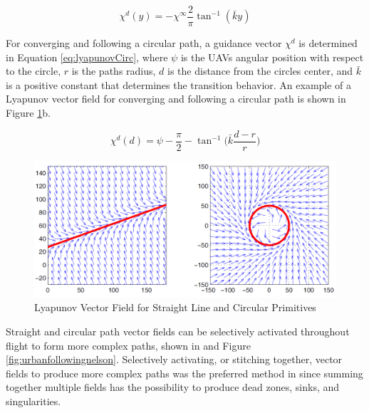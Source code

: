 \documentclass[numbered,pdftex]{ohio-etd}
\begin{document}
\begin{equation}\label{eq:lyapunovStraight}
\chi^d(y) = -\chi^{\infty}\frac{2}{\pi}\tan^{-1}(\bar{k}y)
\end{equation}



For converging and following a circular path, a guidance vector $\chi^{d}$ is determined in Equation \ref{eq:lyapunovCirc}, where $\psi$ is the UAVs angular position with respect to the circle, $r$ is the paths radius, $d$ is the distance from the circles center, and $\bar{k}$ is a positive constant that determines the transition behavior. An example of a Lyapunov vector field for converging and following a circular path is shown in Figure \ref{fig:vfPathPrimitives}b.

\begin{equation}\label{eq:lyapunovCirc}
\chi^d(d) = \psi-\frac{\pi}{2}-\tan^{-1} \bigg(\bar{k} \frac{d-r}{r} \bigg)
\end{equation}


\begin{figure}
	\centering
	\includegraphics[width=13cm]{PaperFigures/nelsonLyapunov}
	\caption{Lyapunov Vector Field for Straight Line and Circular Primitives \cite{nelson_cooperative_2005}}
	\label{fig:vfPathPrimitives}
\end{figure}




Straight and circular path vector fields can be selectively activated throughout flight to form more complex paths, shown in \cite{nelson_cooperative_2005,nelson_vector_2006,nelson_vector_2007,jung_unmanned_2016} and Figure \ref{fig:urbanfollowingnelson}. Selectively activating, or stitching together, vector fields to produce more complex paths was the preferred method in \cite{nelson_cooperative_2005} since summing together multiple fields has the possibility to produce dead zones, sinks, and singularities.
 
\end{document}
